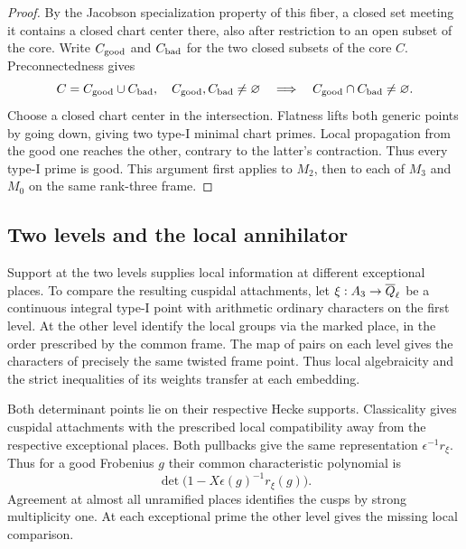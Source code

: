 \begin{proof}
By the Jacobson
specialization property of this fiber, a closed set
meeting it contains a closed chart center there, also after
restriction to an open subset of the core.
Write \(C_{\rm good}\) and \(C_{\rm bad}\) for the two closed subsets of the core \(C\). Preconnectedness gives 
\[
 C=C_{\rm good}\cup C_{\rm bad},\quad C_{\rm good},C_{\rm bad}\ne\varnothing\quad\Longrightarrow\quad C_{\rm good}\cap C_{\rm bad}\ne\varnothing.
\]
 Choose a closed chart center in the
intersection. Flatness lifts both generic points by going
down, giving two type-I minimal chart primes. Local propagation
from the good one reaches the other, contrary to the latter's
contraction. Thus every type-I prime is good. This argument
first applies to \(M_2\), then to each of \(M_3\) and \(M_0\)
on the same rank-three frame.

\end{proof}

\subsection{Two levels and the local annihilator}

Support at the two levels supplies local information at different exceptional places.
To compare the resulting cuspidal attachments, let \(\xi:A_3\to\overline{Q}_\ell\) be a continuous integral
type-I point with arithmetic ordinary characters on the first
level. At the other level identify the local groups via the
marked place, in the order prescribed by the common frame.
The map of pairs on each level gives the characters of precisely
the same twisted frame point. Thus local algebraicity and the
strict inequalities of its weights transfer at each embedding.

Both determinant points lie on their respective Hecke supports.
Classicality gives cuspidal attachments with the prescribed
local compatibility away from the respective exceptional places.
Both pullbacks give the same representation \(\epsilon^{-1}r_\xi\). Thus for a good Frobenius \(g\) their common characteristic polynomial is
\[
 \det\bigl(1-X\epsilon(g)^{-1}r_\xi(g)\bigr).
\]
Agreement at almost all unramified places identifies the cusps by strong multiplicity one. At
each exceptional prime the other level gives the missing local
comparison.

